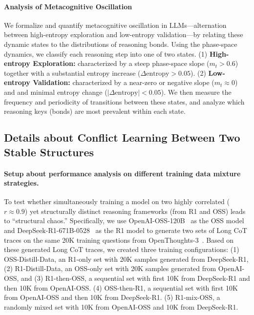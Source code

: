 \paragraph{\textbf{Analysis of Metacognitive Oscillation}}
We formalize and quantify metacognitive oscillation in LLMs—alternation between high-entropy exploration and low-entropy validation—by relating these dynamic states to the distributions of reasoning bonds.
Using the phase-space dynamics, we classify each reasoning step into one of two states. (1) \textbf{High-entropy Exploration:} characterized by a steep phase-space slope (\(m_t >0.6\)) together with a substantial entropy increase (\(\Delta\text{entropy} > 0.05\)).
(2) \textbf{Low-entropy Validation:} characterized by a near-zero or negative slope (\(m_t \approx 0\)) and and minimal entropy change (\(|\Delta\text{entropy}| < 0.05\)).
We then measure the frequency and periodicity of transitions between these states, and analyze which reasoning keys (bonds) are most prevalent within each state.




\subsection{Details about Conflict Learning Between Two Stable Structures}
\label{sec:appendix_conflict}



\paragraph{\textbf{Setup about performance analysis on different training data mixture strategies.}}
To test whether simultaneously training a model on two highly correlated (\(r \approx 0.9\)) yet structurally distinct reasoning frameworks (from R1 and OSS) leads to ``structural chaos.''
Specifically, we use OpenAI-OSS-120B~\citep{gptoss} as the OSS model and DeepSeek-R1-671B-0528~\citep{guo2025deepseek} as the R1 model to generate two sets of Long CoT traces on the same 20K training questions from OpenThoughts-3~\citep{guha2025openthoughts}.
Based on these generated Long CoT traces, we created three training configurations: (1) OSS-Distill-Data, an R1-only set with 20K samples generated from DeepSeek-R1, (2) R1-Distill-Data, an OSS-only set with 20K samples generated from OpenAI-OSS, and (3) R1-then-OSS, a sequential set with first 10K from DeepSeek-R1 and then 10K from OpenAI-OSS. (4) OSS-then-R1, a sequential set with first 10K from OpenAI-OSS and then 10K from DeepSeek-R1.
(5) R1-mix-OSS, a randomly mixed set with 10K from OpenAI-OSS and 10K from DeepSeek-R1.\vspace{-5pt}

